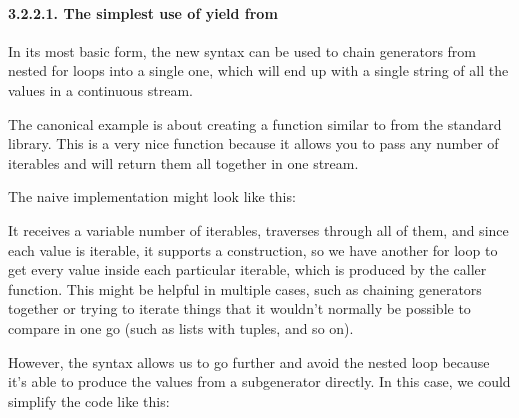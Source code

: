 \documentclass[a4paper,10pt,english]{sphinxmanual}
\begin{document}
\paragraph{3.2.2.1. The simplest use of yield from}
\label{\detokenize{chapters/7_generators/index:the-simplest-use-of-yield-from}}
In its most basic form, the new  syntax can be used to chain generators from
nested for loops into a single one, which will end up with a single string of all the values in
a continuous stream.

The canonical example is about creating a function similar to  from
the standard library. This is a very nice function because it allows you to pass any number
of iterables and will return them all together in one stream.

The naive implementation might look like this:

\begin{sphinxVerbatim}[commandchars=\\\{\}]
 
       
           
             
\end{sphinxVerbatim}

It receives a variable number of iterables, traverses through all of them, and since each
value is iterable, it supports a  construction, so we have another for loop
to get every value inside each particular iterable, which is produced by the caller function.
This might be helpful in multiple cases, such as chaining generators together or trying to
iterate things that it wouldn’t normally be possible to compare in one go (such as lists with
tuples, and so on).

However, the  syntax allows us to go further and avoid the nested loop
because it’s able to produce the values from a sub\sphinxhyphen{}generator directly. In this case, we could
simplify the code like this:

\begin{sphinxVerbatim}[commandchars=\\\{\}]
 
       
         
\end{sphinxVerbatim}
\end{document}
